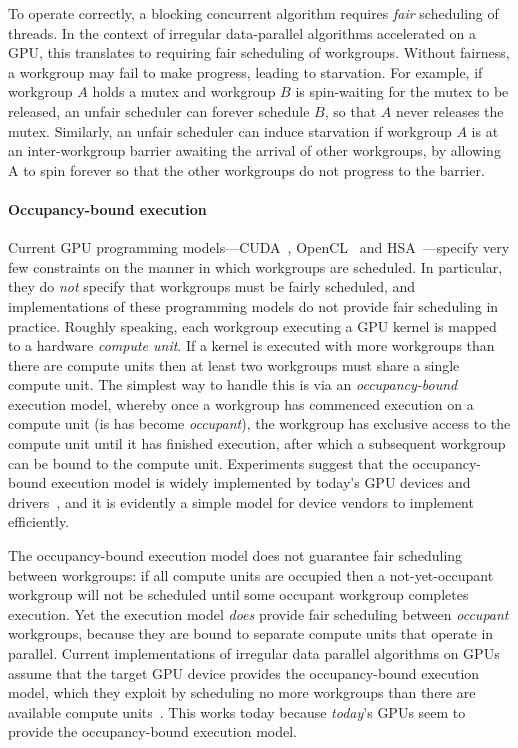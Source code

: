 \documentclass[nocopyrightspace]{sigplanconf-pldi16}
\begin{document}
To operate correctly, a blocking concurrent algorithm requires
\emph{fair} scheduling of threads.  In the context of irregular
data-parallel algorithms accelerated on a GPU, this translates to
requiring fair scheduling of workgroups.  Without fairness, a
workgroup may fail to make progress, leading to starvation.  For
example, if workgroup $A$ holds a mutex and workgroup $B$ is
spin-waiting for the mutex to be released, an unfair scheduler can
forever schedule $B$, so that $A$ never releases the mutex.
Similarly, an unfair scheduler can induce starvation if workgroup $A$
is at an inter-workgroup barrier awaiting the arrival of other
workgroups, by allowing A to spin forever so that the other workgroups
do not progress to the barrier.

\paragraph{Occupancy-bound execution}
Current GPU programming models---CUDA~\cite{...}, OpenCL~\cite{...}
and HSA~\cite{...}---specify very few constraints on the manner in
which workgroups are scheduled.  In particular, they do \emph{not}
specify that workgroups must be fairly scheduled, and implementations
of these programming models do not provide fair scheduling in
practice.  Roughly speaking, each workgroup executing a GPU kernel is
mapped to a hardware \emph{compute unit}.  If a kernel is executed
with more workgroups than there are compute units then at least two
workgroups must share a single compute unit.  The simplest way to
handle this is via an \emph{occupancy-bound} execution model, whereby
once a workgroup has commenced execution on a compute unit (is has
become \emph{occupant}), the workgroup has exclusive access to the
compute unit until it has finished execution, after which a subsequent
workgroup can be bound to the compute unit.  Experiments suggest that
the occupancy-bound execution model is widely implemented by today's
GPU devices and drivers~\cite{...}, and it is evidently a simple model
for device vendors to implement efficiently.

The occupancy-bound execution model does not guarantee fair scheduling
between workgroups: if all compute units are occupied then a
not-yet-occupant workgroup will not be scheduled until some occupant
workgroup completes execution.  Yet the execution model \emph{does}
provide fair scheduling between \emph{occupant} workgroups, because
they are bound to separate compute units that operate in parallel.
Current implementations of irregular data parallel algorithms on GPUs
assume that the target GPU device provides the occupancy-bound
execution model, which they exploit by scheduling no more workgroups
than there are available compute units~\cite{...}.  This works today
because \emph{today}'s GPUs seem to provide the occupancy-bound
execution model.
\end{document}
